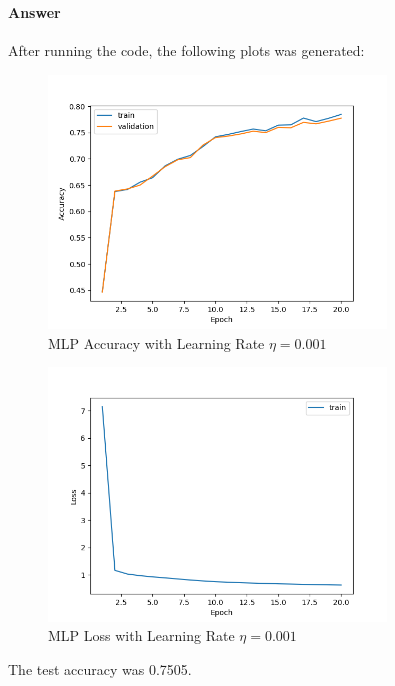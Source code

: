 \documentclass{article}
\begin{document}
\subsubsection{}
\paragraph{Answer} After running the code, the following plots was generated:
\begin{figure}[H]
    \centering
    \includegraphics[width=0.8\textwidth]{"plots/mlp_validation_training.png"}
    \caption{MLP Accuracy with Learning Rate $\eta= 0.001$}
    \label{1.2.b 0.001 Plot}
\end{figure}

\begin{figure}[H]
    \centering
    \includegraphics[width=0.8\textwidth]{"plots/mlp_loss.png"}
    \caption{MLP Loss with Learning Rate $\eta= 0.001$}
    \label{1.2.b Loss Plot}
\end{figure}

The test accuracy was 0.7505.
\end{document}

